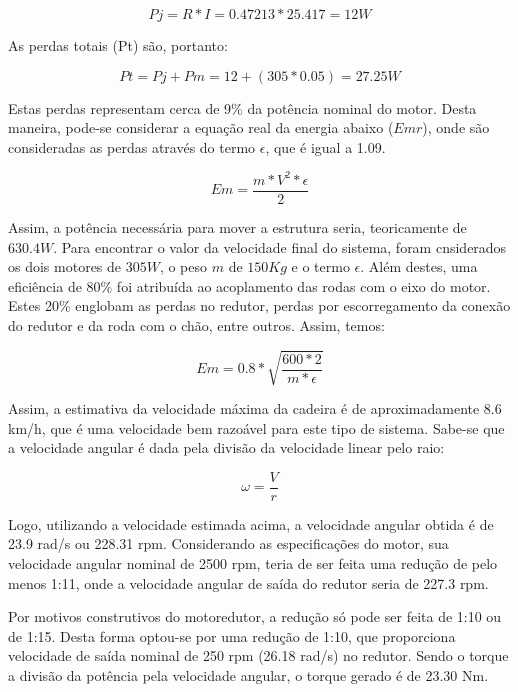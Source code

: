 		\begin{equation}
			Pj = R*I = 0.47213*25.417 = 12 W
		\end{equation}

		As perdas totais (Pt) são, portanto:

		\begin{equation}
			Pt = Pj+Pm = 12+(305*0.05) = 27.25 W
		\end{equation}

		Estas perdas representam cerca de 9\% da potência nominal do motor. Desta maneira, pode-se considerar a equação real da energia abaixo ($Emr$), onde são consideradas as perdas através do termo $\epsilon$, que é igual a 1.09.

		\begin{equation}
			Em = \frac{m*V^2*\epsilon}{2}
		\end{equation}

		Assim, a potência necessária para mover a estrutura seria, teoricamente de $630.4 W$. Para encontrar o valor da velocidade final do sistema, foram cnsiderados os dois motores de $305 W$, o peso $m$ de $150 Kg$ e o termo $\epsilon$. Além destes, uma eficiência de 80\% foi atribuída ao acoplamento das rodas com o eixo do motor. Estes 20\% englobam as perdas no redutor, perdas por escorregamento da conexão do redutor e da roda com o chão, entre outros. Assim, temos:

		\begin{equation}
			Em = 0.8*\sqrt{\frac{600*2}{m*\epsilon}}
		\end{equation}

		Assim, a estimativa da velocidade máxima da cadeira é de aproximadamente 8.6 km/h, que é uma velocidade bem razoável para este tipo de sistema. Sabe-se que a velocidade angular é dada pela divisão da velocidade linear pelo raio:

		\begin{equation}
			\omega = \frac{V}{r}
		\end{equation}

		Logo, utilizando a velocidade estimada acima, a velocidade angular obtida é de 23.9 rad/s ou 228.31 rpm. Considerando as especificações do motor, sua velocidade angular nominal de 2500 rpm, teria de ser feita uma redução de pelo menos 1:11, onde a velocidade angular de saída do redutor seria de 227.3 rpm.

		Por motivos construtivos do motoredutor, a redução só pode ser feita de 1:10 ou de 1:15. Desta forma optou-se por uma redução de 1:10, que proporciona velocidade de saída nominal de 250 rpm (26.18 rad/s) no redutor. Sendo o torque a divisão da potência pela velocidade angular, o torque gerado é de 23.30 Nm.

